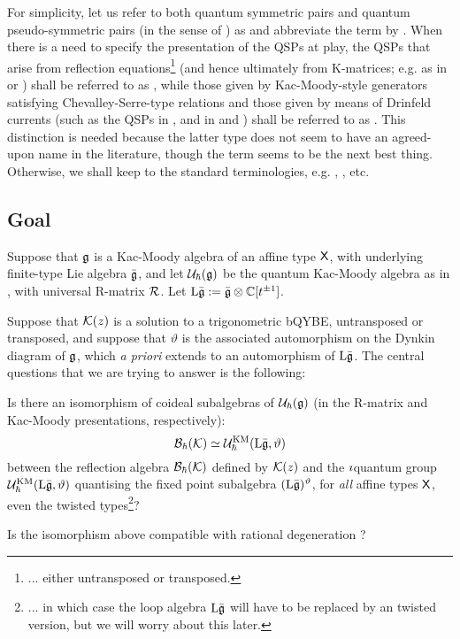        For simplicity, let us refer to both quantum symmetric pairs and quantum pseudo-symmetric pairs (in the sense of \cite{regelskis_vlaar_kac_moody_pseudo_symmetric_pairs}) as  and abbreviate the term by . When there is a need to specify the presentation of the QSPs at play, the QSPs that arise from reflection equations\footnote{... either untransposed or transposed.} (and hence ultimately from K-matrices; e.g. as in \cite{molev_ragoucy_sorba_twisted_q_yangians_type_A} or \cite{guay_regelskis_twisted_yangians_for_symmetric_pairs_of_types_BCD}) shall be referred to as , while those given by Kac-Moody-style generators satisfying Chevalley-Serre-type relations and those given by means of Drinfeld currents (such as the QSPs in \cite{regelskis_vlaar_reflection_matrices_coideal_subalgebras}, and in \cite{lu_wang_drinfeld_current_presentation_for_affine_iQUEs_1} and \cite{zhang_drinfeld_current_presentation_for_affine_iQUEs_2}) shall be referred to as . This distinction is needed because the latter type does not seem to have an agreed-upon name in the literature, though the term  seems to be the next best thing. Otherwise, we shall keep to the standard terminologies, e.g. , , etc.

    \subsection{Goal}
        Suppose that $\mathfrak{g}$ is a Kac-Moody algebra of an affine type $\mathsf{X}$, with underlying finite-type Lie algebra $\bar{\mathfrak{g}}$, and let $\mathcal{U}_{\hbar}(\mathfrak{g})$ be the quantum Kac-Moody algebra as in \cite{etingof_kazhdan_quantisation_6}, with universal R-matrix $\mathcal{R}$. Let $\Loop \bar{\g} := \bar{\g} \tensor \bbC[t^{\pm 1}]$.
        
        Suppose that $\mathcal{K}(z)$ is a solution to a trigonometric bQYBE, untransposed or transposed, and suppose that $\vartheta$ is the associated automorphism on the Dynkin diagram of $\mathfrak{g}$, which \textit{a priori} extends to an automorphism of $\mathrm{L} \bar{\mathfrak{g}}$. The central questions that we are trying to answer is the following:
        \begin{question}
            Is there an isomorphism of coideal subalgebras of $\mathcal{U}_{\hbar}(\mathfrak{g})$ (in the R-matrix and Kac-Moody presentations, respectively):
                $$\mathcal{B}_{\hbar}(\mathcal{K}) \simeq \mathcal{U}_{\hbar}^{\mathrm{KM}}(\mathrm{L} \bar{\mathfrak{g}}, \vartheta)$$
            between the reflection algebra $\mathcal{B}_{\hbar}(\mathcal{K})$ defined by $\mathcal{K}(z)$ and the $\imath$quantum group $\mathcal{U}_{\hbar}^{\mathrm{KM}}(\mathrm{L} \bar{\mathfrak{g}}, \vartheta)$ quantising the fixed point subalgebra $(\mathrm{L} \bar{\mathfrak{g}})^{\vartheta}$, for \textit{all} affine types $\mathsf{X}$, even the twisted types\footnote{... in which case the loop algebra $\mathrm{L} \bar{\mathfrak{g}}$ will have to be replaced by an twisted version, but we will worry about this later.}?
        \end{question}
        \begin{question}
            Is the isomorphism above compatible with rational degeneration ?
        \end{question}
        
